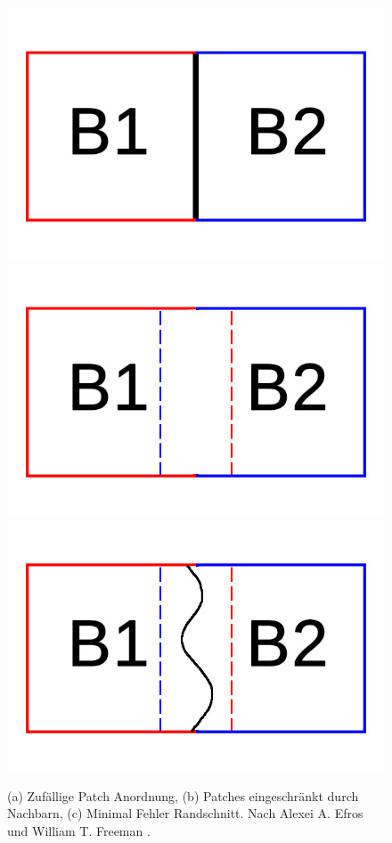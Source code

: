 \documentclass[12pt, a4paper,twoside,openright]{report} %
\begin{document}
\begin{figure}[H]
    \centering
    \includegraphics[width=0.25\linewidth]{images/Random-blocks.jpg}%
    \qquad
    \includegraphics[width=0.25\linewidth]{images/overlap-blocks.jpg}%
    \qquad
    \includegraphics[width=0.25\linewidth]{images/minimum-boundary-blocks.jpg}%
    \qquad
    \qquad
    \qquad
    \qquad
    \caption{(a) Zufällige Patch Anordnung, (b) Patches eingeschränkt durch Nachbarn, (c) Minimal Fehler Randschnitt. Nach Alexei A. Efros und William T. Freeman \cite{EfrosQuilt}.}%
\end{figure}
\end{document}
